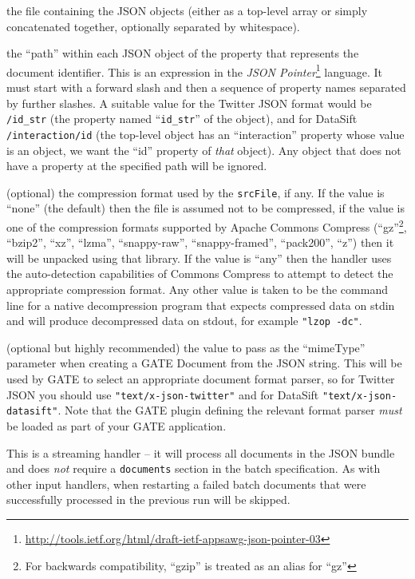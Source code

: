 \bde
\item[srcFile] the file containing the JSON objects (either as a top-level
  array or simply concatenated together, optionally separated by whitespace).
\item[idPointer] the ``path'' within each JSON object of the property that
  represents the document identifier.  This is an expression in the \emph{JSON
  Pointer}\footnote{\url{http://tools.ietf.org/html/draft-ietf-appsawg-json-pointer-03}}
  language.  It must start with a forward slash and then a sequence of property
  names separated by further slashes.  A suitable value for the Twitter JSON
  format would be \verb!/id_str! (the property named ``\verb!id_str!'' of the
  object), and for DataSift \verb!/interaction/id! (the top-level object has an
  ``interaction'' property whose value is an object, we want the ``id''
  property of \emph{that} object).  Any object that does not have a property at
  the specified path will be ignored.
\item[compression] (optional) the compression format used by the
  \verb!srcFile!, if any.  If the value is ``none'' (the default) then the file
  is assumed not to be compressed, if the value is one of the compression formats
  supported by Apache Commons Compress (``gz''\footnote{For backwards
  compatibility, ``gzip'' is treated as an alias for ``gz''}, ``bzip2'',
  ``xz'', ``lzma'', ``snappy-raw'', ``snappy-framed'', ``pack200'', ``z'') then 
  it will be unpacked using that library.  If the value is ``any'' then the
  handler uses the auto-detection capabilities of Commons Compress to attempt
  to detect the appropriate compression format.  Any other value is taken to be
  the command line for a native decompression program that expects compressed
  data on stdin and will produce decompressed data on stdout, for example
  \verb!"lzop -dc"!.
\item[mimeType] (optional but highly recommended) the value to pass as the
  ``mimeType'' parameter when creating a GATE Document from the JSON string.
  This will be used by GATE to select an appropriate document format parser, so
  for Twitter JSON you should use \verb!"text/x-json-twitter"! and for DataSift
  \verb!"text/x-json-datasift"!.  Note that the GATE plugin defining the
  relevant format parser \emph{must} be loaded as part of your GATE
  application.
\ede

This is a streaming handler -- it will process all documents in the JSON bundle
and does \emph{not} require a \verb!documents! section in the batch
specification.  As with other input handlers, when restarting a failed batch
documents that were successfully processed in the previous run will be skipped.

